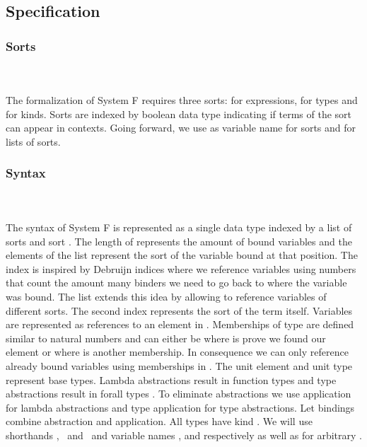 \subsection{Specification}
\subsubsection{Sorts}\hfill\\\\
The formalization of System F requires three sorts:  for expressions,  for types and  for kinds. 
\FSort
Sorts are indexed by boolean data type  indicating if terms of the sort can appear in contexts.
Going forward, we use  as variable name for sorts and  for lists of sorts.

\subsubsection{Syntax}\hfill\\\\
The syntax of System F is represented as a single data type  indexed by a list of sorts  and sort . 
The length of  represents the amount of bound variables and the elements  of the list represent the sort of the variable bound at that position. The index  is inspired by Debruijn indices where we reference variables using numbers that count the amount many binders we need to go back to where the variable was bound. The list  extends this idea by allowing to reference variables of different sorts.
The second index  represents the sort of the term itself.
\FTerm
Variables \  are represented as references    to an element in .
Memberships of type    are defined similar to natural numbers and can either be  where  is prove we found our element or   where  is another membership. 
In consequence we can only reference already bound variables using memberships in .
The unit element  and unit type  represent base types. Lambda abstractions   result in function types    and type abstractions   result in forall types  . 
To eliminate abstractions we use application    for lambda abstractions and type application    for type abstractions. 
Let bindings     combine abstraction and application. All types  have kind .
We will use shorthands \FVar, \FExpr\ and \FType\ and variable names ,  and  respectively as well as  for arbitrary   .

